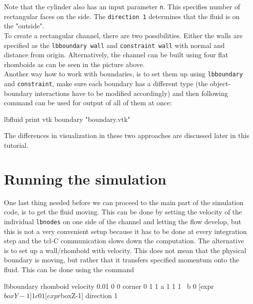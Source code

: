 \documentclass[
a4paper,                        %
11pt,                           %
twoside,                        %
footsepline,                    %
headsepline,                    %
headexclude,                    %
footexclude,                    %
pagesize,                       %
]{scrartcl}
\begin{document}
 \vspace{0 mm}

Note that the cylinder also has an input parameter \verb|n|. This specifies number of rectangular faces on the side. The \verb|direction 1| determines that the fluid is on the "outside".\\
   
To create a rectangular channel, there are two possibilities. Either the walls are specified as the \verb|lbboundary wall| and \verb|constraint wall| with normal and distance from origin. Alternatively, the channel can be built using four flat rhomboids as can be seen in the picture above.\\  

Another way how to work with boundaries, is to set them up using \verb|lbboundary| and \verb|constraint|, make sure each boundary has a different type (the object-boundary interactions have to be modified accordingly) and then following command can be used for output of all of them at once:\\
 \begin{tclcode}
lbfluid print vtk boundary "boundary.vtk"
 \end{tclcode}
 \vspace{0 mm}
 
The differences in visualization in these two approaches are discussed later in this tutorial.

\section{Running the simulation}
One last thing needed before we can proceed to the main part of the simulation code, is to get the fluid moving. This can be done by setting the velocity of the individual \verb|lbnodes| on one side of the channel and letting the flow develop, but this is not a very convenient setup because it has to be done at every integration step and the tcl-C communication slows down the computation. The alternative is to set up a wall/rhomboid with velocity. This does not mean that the physical boundary is moving, but rather that it transfers specified momentum onto the fluid. This can be done using the command\\
\begin{tclcode}
lbboundary rhomboid velocity 0.01 0 0 corner 0 1 1 a 1 1 1 \
b 0 [expr $boxY-1] 1 c 0 1 [expr $boxZ-1] direction 1 
 \end{tclcode}
 \vspace{0 mm}
\end{document}
